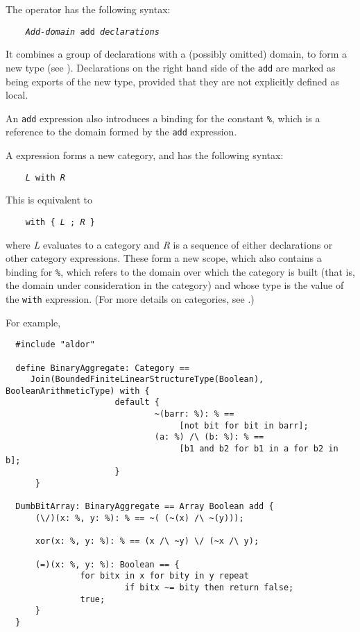 The  operator  has the following syntax:

\verb^    ^{\tt {\em Add-domain} add {\em declarations}}

It combines a group of declarations
with a (possibly omitted) domain, to form a new type
(see ).  Declarations on the right hand
side of the \verb"add" are marked as being exports of the new type,
provided that they are not explicitly defined as local.

An \verb"add" expression also introduces a binding for the constant
{\tt \%}, which is a reference to the domain formed by the {\tt add}
expression.


A  expression forms a new category, and has the following
syntax:

\verb"    "{\tt {\em L\/} with {\em R}}

This is equivalent to

\verb"    "{\tt with \{ {\em L\/} ; {\em R\/} \}}

where {\em L\/} evaluates to a category and {\em R} is a sequence of
either declarations or other category expressions. These form a new
scope, which also contains a binding for {\tt \%}, which refers to the
domain over which the category is built (that is, the domain under
consideration in the category) and whose type is the value of the
{\tt with} expression.
(For more details on categories, see .)

For example,

\begin{small}
\begin{verbatim}
  #include "aldor"

  define BinaryAggregate: Category ==
     Join(BoundedFiniteLinearStructureType(Boolean), BooleanArithmeticType) with {
                      default {
                              ~(barr: %): % ==
                                   [not bit for bit in barr];
                              (a: %) /\ (b: %): % ==
                                   [b1 and b2 for b1 in a for b2 in b];
                      }
      }

  DumbBitArray: BinaryAggregate == Array Boolean add {
      (\/)(x: %, y: %): % == ~( (~(x) /\ ~(y)));

      xor(x: %, y: %): % == (x /\ ~y) \/ (~x /\ y);

      (=)(x: %, y: %): Boolean == {
               for bitx in x for bity in y repeat
                        if bitx ~= bity then return false;
               true;
      }
  }

\end{verbatim}
\end{small}

